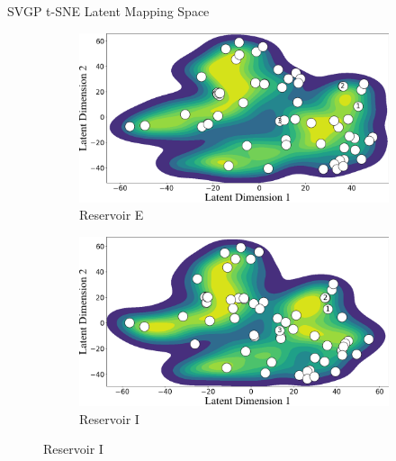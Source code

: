 \begin{frame}{SVGP t-SNE Latent Mapping Space}
	\begin{figure}[htbp]
		\centering
		\tiny
		\begin{subfigure}[t]{0.4\columnwidth}
			\centering
			\includegraphics[width=\columnwidth]{chp_sogp/figures/TSNE_task4_kde_p30.png}
			\caption{Reservoir E}
		\end{subfigure}
		\hspace{0.05\columnwidth} %
		\begin{subfigure}[t]{0.4\columnwidth}
			\centering
			\includegraphics[width=\columnwidth]{chp_sogp/figures/TSNE_task8_kde_p30.png}
			\caption{Reservoir I}
		\end{subfigure}
		
		

\end{figure}
\end{frame}
